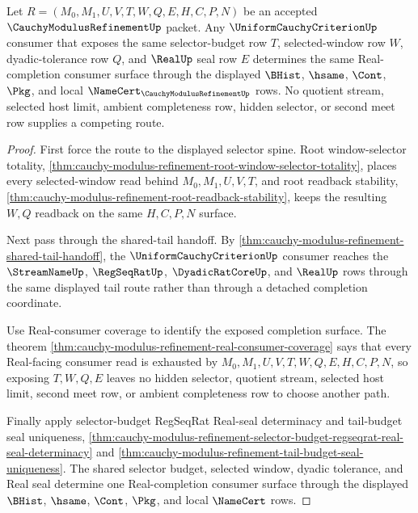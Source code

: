 \begin{theorem}
\label{thm:cauchy-modulus-refinement-uniform-criterion-real-route-determinacy}
Let $R=(M_0,M_1,U,V,T,W,Q,E,H,C,P,N)$ be an accepted $\CauchyModulusRefinementUp$ packet. Any $\UniformCauchyCriterionUp$ consumer that exposes the same selector-budget row $T$, selected-window row $W$, dyadic-tolerance row $Q$, and $\RealUp$ seal row $E$ determines the same Real-completion consumer surface through the displayed $\BHist$, $\hsame$, $\Cont$, $\Pkg$, and local $\NameCert_{\CauchyModulusRefinementUp}$ rows. No quotient stream, selected host limit, ambient completeness row, hidden selector, or second meet row supplies a competing route.
\end{theorem}
\begin{proof}
First force the route to the displayed selector spine. Root window-selector totality, \autoref{thm:cauchy-modulus-refinement-root-window-selector-totality}, places every selected-window read behind $M_0,M_1,U,V,T$, and root readback stability, \autoref{thm:cauchy-modulus-refinement-root-readback-stability}, keeps the resulting $W,Q$ readback on the same $H,C,P,N$ surface.

Next pass through the shared-tail handoff. By \autoref{thm:cauchy-modulus-refinement-shared-tail-handoff}, the $\UniformCauchyCriterionUp$ consumer reaches the $\StreamNameUp$, $\RegSeqRatUp$, $\DyadicRatCoreUp$, and $\RealUp$ rows through the same displayed tail route rather than through a detached completion coordinate.

Use Real-consumer coverage to identify the exposed completion surface. The theorem \autoref{thm:cauchy-modulus-refinement-real-consumer-coverage} says that every Real-facing consumer read is exhausted by $M_0,M_1,U,V,T,W,Q,E,H,C,P,N$, so exposing $T,W,Q,E$ leaves no hidden selector, quotient stream, selected host limit, second meet row, or ambient completeness row to choose another path.

Finally apply selector-budget RegSeqRat Real-seal determinacy and tail-budget seal uniqueness, \autoref{thm:cauchy-modulus-refinement-selector-budget-regseqrat-real-seal-determinacy} and \autoref{thm:cauchy-modulus-refinement-tail-budget-seal-uniqueness}. The shared selector budget, selected window, dyadic tolerance, and Real seal determine one Real-completion consumer surface through the displayed $\BHist$, $\hsame$, $\Cont$, $\Pkg$, and local $\NameCert$ rows.
\end{proof}

